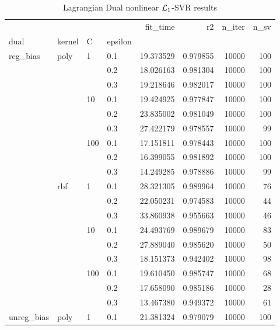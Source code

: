 \begin{table}[H]
\centering
\caption{Lagrangian Dual nonlinear $\protect \mathcal{L}_1$-SVR results}
\label{nonlinear_lagrangian_dual_l1_svr_cv_results}
\begin{tabular}{llllrrrr}
\toprule
           &     &     &     &   fit\_time &        r2 &  n\_iter &  n\_sv \\
dual & kernel & C & epsilon &            &           &         &       \\
\midrule
reg\_bias & poly & 1   & 0.1 &  19.373529 &  0.979855 &   10000 &   100 \\
           &     &     & 0.2 &  18.026163 &  0.981304 &   10000 &   100 \\
           &     &     & 0.3 &  19.218646 &  0.982017 &   10000 &   100 \\
           &     & 10  & 0.1 &  19.424925 &  0.977847 &   10000 &   100 \\
           &     &     & 0.2 &  23.835002 &  0.981049 &   10000 &   100 \\
           &     &     & 0.3 &  27.422179 &  0.978557 &   10000 &    99 \\
           &     & 100 & 0.1 &  17.151811 &  0.978443 &   10000 &   100 \\
           &     &     & 0.2 &  16.399055 &  0.981892 &   10000 &   100 \\
           &     &     & 0.3 &  14.249285 &  0.978886 &   10000 &    99 \\
           & rbf & 1   & 0.1 &  28.321305 &  0.989964 &   10000 &    76 \\
           &     &     & 0.2 &  22.050231 &  0.974583 &   10000 &    44 \\
           &     &     & 0.3 &  33.860938 &  0.955663 &   10000 &    46 \\
           &     & 10  & 0.1 &  24.493769 &  0.989679 &   10000 &    83 \\
           &     &     & 0.2 &  27.889040 &  0.985620 &   10000 &    50 \\
           &     &     & 0.3 &  18.151373 &  0.942402 &   10000 &    98 \\
           &     & 100 & 0.1 &  19.610450 &  0.985747 &   10000 &    68 \\
           &     &     & 0.2 &  17.658090 &  0.985186 &   10000 &    28 \\
           &     &     & 0.3 &  13.467380 &  0.949372 &   10000 &    61 \\
unreg\_bias & poly & 1   & 0.1 &  21.381324 &  0.979079 &   10000 &   100 \\

\end{tabular}
\end{table}
